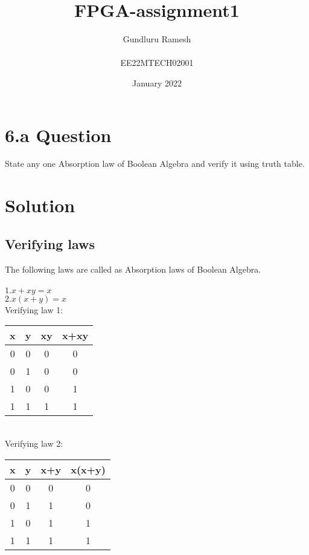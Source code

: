 \documentclass{article}
\title{FPGA-assignment1}
\author{Gundluru Ramesh \\ \\EE22MTECH02001 }
\date{January 2022}
\begin{document}
\maketitle

\section{6.a Question}
State any one Absorption law of Boolean Algebra and verify it using truth table.
\section{Solution}

\subsection{Verifying laws}
The following laws are called as Absorption laws of Boolean Algebra.\\
\\
 $1. x+xy = x $ \\
 $2. x(x+y) = x$ \\
 
Verifying law 1: \\
    \begin{table} [h]
    \centering
    \begin{tabular}{ | c | c | c | c | }
    \hline
    x & y & xy & x+xy \\ [0.5ex]
     \hline
    0 & 0 & 0 & 0 \\
    0 & 1 & 0 & 0 \\
    1 & 0 & 0 & 1 \\
    1 & 1 & 1 & 1 \\ [1ex]
    \hline
    \end{tabular}
    \end{table}
\\

Verifying law 2:

    \begin{table} [h]
    \centering
    \begin{tabular}{ | c | c | c | c | }
    \hline
    x & y & x+y & x(x+y) \\ [0.5ex]
     \hline
    0 & 0 & 0 & 0 \\
    0 & 1 & 1 & 0 \\
    1 & 0 & 1 & 1 \\
    1 & 1 & 1 & 1 \\ [1ex]
    \hline
    \end{tabular}
    \end{table}
\end{document}
